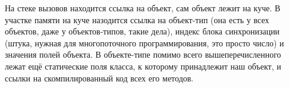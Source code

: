 \documentclass{../../text-style}
\begin{document}
На стеке вызовов находится ссылка на объект, сам объект лежит на куче. В участке памяти на куче назодится ссылка на объект-тип (она есть у всех объектов, даже у объектов-типов, такие дела), индекс блока синхронизации (штука, нужная для многопоточного программирования, это просто число) и значения полей объекта. В объекте-типе помимо всего вышеперечисленного лежат ещё статические поля класса, к которому принадлежит наш объект, и ссылки на скомпилированный код всех его методов.
\end{document}

